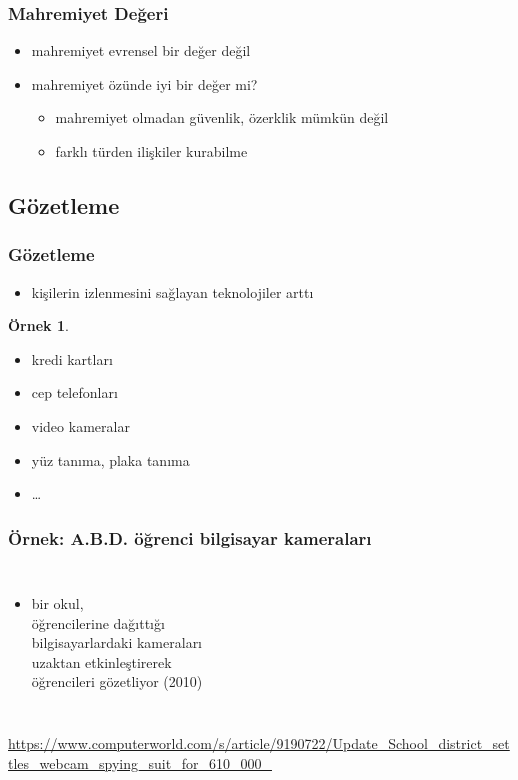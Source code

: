 \documentclass[dvipsnames]{beamer}
\theoremstyle{definition}
\theoremstyle{example}
\newtheorem{ornek}[theorem]{Örnek}
\theoremstyle{plain}
\begin{document}
\begin{frame}
  \frametitle{Mahremiyet Değeri}

  \begin{itemize}
    \item mahremiyet evrensel bir değer değil

    \pause
    \medskip
    \item mahremiyet özünde iyi bir değer mi?
    \begin{itemize}
      \item mahremiyet olmadan güvenlik, özerklik mümkün değil
      \item farklı türden ilişkiler kurabilme
    \end{itemize}
  \end{itemize}
\end{frame}

\subsection{Gözetleme}

\begin{frame}
  \frametitle{Gözetleme}

  \begin{itemize}
    \item kişilerin izlenmesini sağlayan teknolojiler arttı
  \end{itemize}

  \pause
  \begin{ornek}
    \begin{itemize}
      \item kredi kartları
      \item cep telefonları
      \item video kameralar
      \item yüz tanıma, plaka tanıma
      \item \ldots
    \end{itemize}
  \end{ornek}
\end{frame}

\begin{frame}
  \frametitle{Örnek: A.B.D. öğrenci bilgisayar kameraları}

  \begin{columns}

    \begin{itemize}
      \item bir okul,\\
        öğrencilerine dağıttığı\\
        bilgisayarlardaki kameraları\\
        uzaktan etkinleştirerek\\
        öğrencileri gözetliyor (2010)
    \end{itemize}
  \end{columns}

  \medskip
  \tiny{\url{https://www.computerworld.com/s/article/9190722/Update_School_district_settles_webcam_spying_suit_for_610_000_}}\\
\end{frame}
\end{document}
